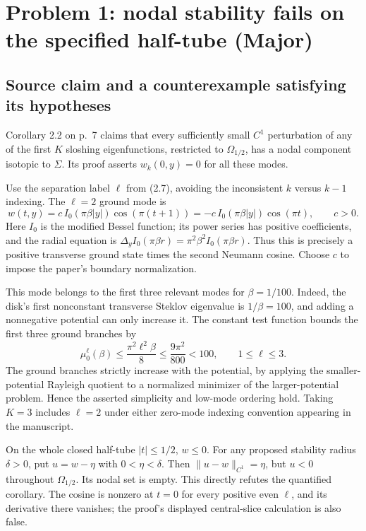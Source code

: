 \documentclass[10pt]{article}
\begin{document}
\section*{Problem 1: nodal stability fails on the specified half-tube (Major)}
\subsection*{Source claim and a counterexample satisfying its hypotheses}
Corollary 2.2 on p. 7 claims that every sufficiently small \(C^1\) perturbation of any of the first \(K\) sloshing eigenfunctions, restricted to \(\Omega_{1/2}\), has a nodal component isotopic to \(\Sigma\). Its proof asserts \(w_k(0,y)=0\) for all these modes.\par
Use the separation label \(\ell\) from (2.7), avoiding the inconsistent \(k\) versus \(k-1\) indexing. The \(\ell=2\) ground mode is \[w(t,y)=c\,I_0(\pi\beta|y|)\cos(\pi(t+1))
       =-c\,I_0(\pi\beta|y|)\cos(\pi t),\qquad c>0.\] Here \(I_0\) is the modified Bessel function; its power series has positive coefficients, and the radial equation is \(\Delta_y I_0(\pi\beta r)=\pi^2\beta^2 I_0(\pi\beta r)\). Thus this is precisely a positive transverse ground state times the second Neumann cosine. Choose \(c\) to impose the paper’s boundary normalization.\par
This mode belongs to the first three relevant modes for \(\beta=1/100\). Indeed, the disk’s first nonconstant transverse Steklov eigenvalue is \(1/\beta=100\), and adding a nonnegative potential can only increase it. The constant test function bounds the first three ground branches by \[\mu_0^\ell(\beta)\leq\frac{\pi^2\ell^2\beta}{8}
 \leq\frac{9\pi^2}{800}<100,\qquad1\leq\ell\leq3 .\] The ground branches strictly increase with the potential, by applying the smaller-potential Rayleigh quotient to a normalized minimizer of the larger-potential problem. Hence the asserted simplicity and low-mode ordering hold. Taking \(K=3\) includes \(\ell=2\) under either zero-mode indexing convention appearing in the manuscript.\par
On the whole closed half-tube \(|t|\leq1/2\), \(w\leq0\). For any proposed stability radius \(\delta>0\), put \(u=w-\eta\) with \(0<\eta<\delta\). Then \(\|u-w\|_{C^1}=\eta\), but \(u<0\) throughout \(\Omega_{1/2}\). Its nodal set is empty. This directly refutes the quantified corollary. The cosine is nonzero at \(t=0\) for every positive even \(\ell\), and its derivative there vanishes; the proof’s displayed central-slice calculation is also false.\par
\end{document}
